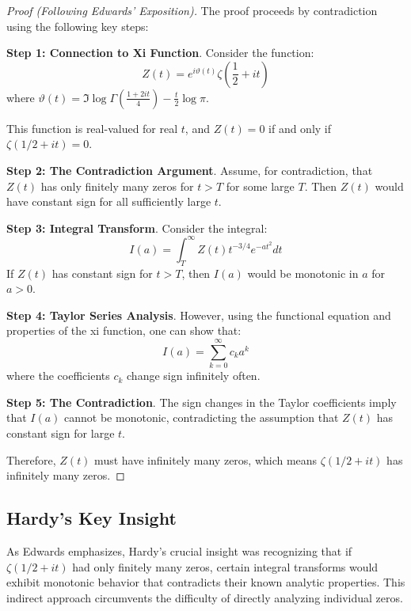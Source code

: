 \begin{proof}[Proof (Following Edwards' Exposition)]
The proof proceeds by contradiction using the following key steps:

\textbf{Step 1: Connection to Xi Function}. Consider the function:
\begin{equation}
Z(t) = e^{i\vartheta(t)} \zeta\left(\frac{1}{2} + it\right)
\end{equation}
where $\vartheta(t) = \Im \log \Gamma\left(\frac{1 + 2it}{4}\right) - \frac{t}{2}\log \pi$.

This function is real-valued for real $t$, and $Z(t) = 0$ if and only if $\zeta(1/2 + it) = 0$.

\textbf{Step 2: The Contradiction Argument}. Assume, for contradiction, that $Z(t)$ has only finitely many zeros for $t > T$ for some large $T$. Then $Z(t)$ would have constant sign for all sufficiently large $t$.

\textbf{Step 3: Integral Transform}. Consider the integral:
\begin{equation}
I(a) = \int_T^{\infty} Z(t) t^{-3/4} e^{-at^2} dt
\end{equation}
If $Z(t)$ has constant sign for $t > T$, then $I(a)$ would be monotonic in $a$ for $a > 0$.

\textbf{Step 4: Taylor Series Analysis}. However, using the functional equation and properties of the xi function, one can show that:
\begin{equation}
I(a) = \sum_{k=0}^{\infty} c_k a^k
\end{equation}
where the coefficients $c_k$ change sign infinitely often.

\textbf{Step 5: The Contradiction}. The sign changes in the Taylor coefficients imply that $I(a)$ cannot be monotonic, contradicting the assumption that $Z(t)$ has constant sign for large $t$.

Therefore, $Z(t)$ must have infinitely many zeros, which means $\zeta(1/2 + it)$ has infinitely many zeros.
\end{proof}

\subsection{Hardy's Key Insight}

As Edwards \cite{edwards1974} emphasizes, Hardy's crucial insight was recognizing that if $\zeta(1/2 + it)$ had only finitely many zeros, certain integral transforms would exhibit monotonic behavior that contradicts their known analytic properties. This indirect approach circumvents the difficulty of directly analyzing individual zeros.


